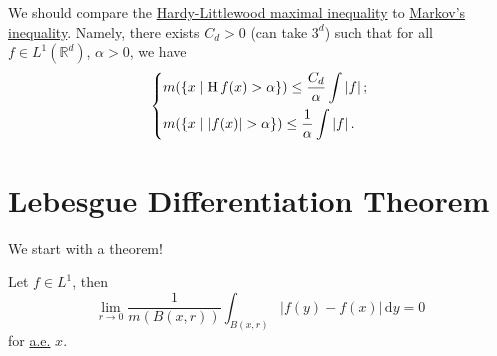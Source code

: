 We should compare the \hyperref[thm:HL-maximal-inequality]{Hardy-Littlewood maximal inequality} to \hyperref[lma:Markov-inequality]{Markov's inequality}.
Namely, there exists \(C_{d} >0\) (can take \(3^d\)) such that for all \(f\in L^1(\mathbb{R} ^d)\), \(\alpha > 0\), we have
\[
	\begin{dcases}
		m(\left\{x\mid \operatorname{H}f(x) > \alpha\right\})                \leq \frac{C_{d} }{\alpha }\int \left\vert f \right\vert; \\
		m(\left\{x\mid \left\vert f(x) \right\vert > \alpha \right\})  \leq \frac{1}{\alpha }\int \left\vert f \right\vert.
	\end{dcases}
\]

\section{Lebesgue Differentiation Theorem}
We start with a theorem!
\begin{theorem}\label{thm:Lebesgue-differentiation-theorem}
	Let \(f\in L^1\), then
	\[
		\lim\limits_{r \to 0} \frac{1}{m(B(x, r))}\int_{B(x, r)}\left\vert f(y) - f(x) \right\vert   \,\mathrm{d}y = 0
	\]
	for \hyperref[def:mu-almost-everywhere]{a.e.} \(x\).
\end{theorem}
